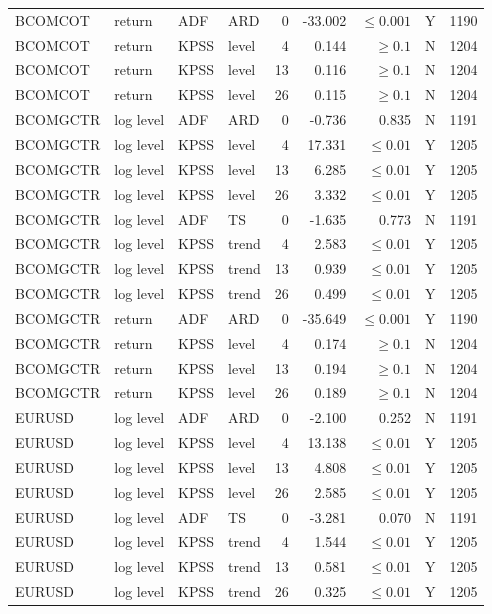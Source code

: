 {\begin{longtable}{@{}llllrrrrr@{}}
BCOMCOT & return & ADF & ARD & 0 & -33.002 & $\leq 0.001$ & Y & 1190\\
BCOMCOT & return & KPSS & level & 4 & 0.144 & $\geq 0.1$ & N & 1204\\
BCOMCOT & return & KPSS & level & 13 & 0.116 & $\geq 0.1$ & N & 1204\\
BCOMCOT & return & KPSS & level & 26 & 0.115 & $\geq 0.1$ & N & 1204\\
BCOMGCTR & log level & ADF & ARD & 0 & -0.736 & 0.835 & N & 1191\\
BCOMGCTR & log level & KPSS & level & 4 & 17.331 & $\leq 0.01$ & Y & 1205\\
BCOMGCTR & log level & KPSS & level & 13 & 6.285 & $\leq 0.01$ & Y & 1205\\
BCOMGCTR & log level & KPSS & level & 26 & 3.332 & $\leq 0.01$ & Y & 1205\\
BCOMGCTR & log level & ADF & TS & 0 & -1.635 & 0.773 & N & 1191\\
BCOMGCTR & log level & KPSS & trend & 4 & 2.583 & $\leq 0.01$ & Y & 1205\\
BCOMGCTR & log level & KPSS & trend & 13 & 0.939 & $\leq 0.01$ & Y & 1205\\
BCOMGCTR & log level & KPSS & trend & 26 & 0.499 & $\leq 0.01$ & Y & 1205\\
BCOMGCTR & return & ADF & ARD & 0 & -35.649 & $\leq 0.001$ & Y & 1190\\
BCOMGCTR & return & KPSS & level & 4 & 0.174 & $\geq 0.1$ & N & 1204\\
BCOMGCTR & return & KPSS & level & 13 & 0.194 & $\geq 0.1$ & N & 1204\\
BCOMGCTR & return & KPSS & level & 26 & 0.189 & $\geq 0.1$ & N & 1204\\
EURUSD & log level & ADF & ARD & 0 & -2.100 & 0.252 & N & 1191\\
EURUSD & log level & KPSS & level & 4 & 13.138 & $\leq 0.01$ & Y & 1205\\
EURUSD & log level & KPSS & level & 13 & 4.808 & $\leq 0.01$ & Y & 1205\\
EURUSD & log level & KPSS & level & 26 & 2.585 & $\leq 0.01$ & Y & 1205\\
EURUSD & log level & ADF & TS & 0 & -3.281 & 0.070 & N & 1191\\
EURUSD & log level & KPSS & trend & 4 & 1.544 & $\leq 0.01$ & Y & 1205\\
EURUSD & log level & KPSS & trend & 13 & 0.581 & $\leq 0.01$ & Y & 1205\\
EURUSD & log level & KPSS & trend & 26 & 0.325 & $\leq 0.01$ & Y & 1205\\

\end{longtable}}
